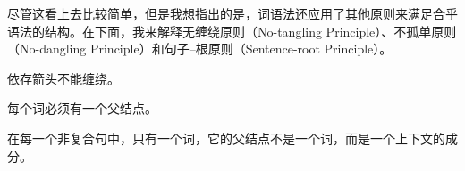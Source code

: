 
尽管这看上去比较简单，但是我想指出的是，词语法还应用了其他原则来满足合乎语法的结构。在下面，我来解释无缠绕原则（No-tangling Principle）、不孤单原则（No-dangling Principle）和句子--根原则（Sentence-root Principle）。
\begin{principle}[无缠绕原则]
依存箭头不能缠绕。
\end{principle}

\begin{principle}[不孤单原则]
每个词必须有一个父结点。
\end{principle}

\begin{principle}[句子--根原则]
在每一个非复合句中，只有一个词，它的父结点不是一个词，而是一个上下文的成分。
\end{principle}

